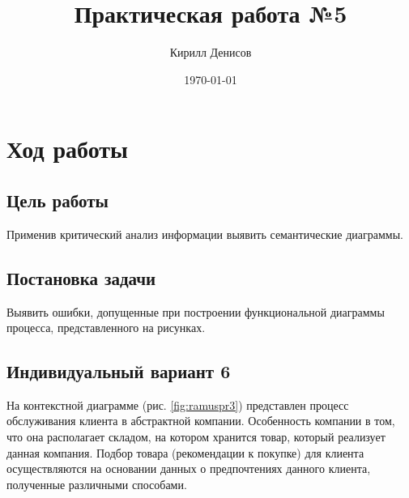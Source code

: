 \documentclass[a4paper,14pt]{extarticle}
\author{Кирилл Денисов}
\title{Практическая работа №5}
\date{\today}
\newcommand{\pathToCommonFolder}{/home/denilai/Documents/repos/latex/Common}
\begin{document}
	\thispagestyle{empty}
	
	\newpage
	\newpage
	\section*{Ход работы}
	
	
	\subsection*{Цель работы}
	Применив критический анализ информации выявить семантические диаграммы.
	
	\subsection*{Постановка задачи}
	Выявить ошибки, допущенные при построении функциональной диаграммы процесса, представленного на рисунках.

	\subsection*{Индивидуальный вариант 6}
	На контекстной диаграмме (рис. \ref{fig:ramuspr3}) представлен процесс обслуживания клиента в абстрактной компании. Особенность компании в том, что она располагает складом, на котором хранится товар, который реализует данная компания. Подбор товара (рекомендации к покупке) для клиента осуществляются на основании данных о предпочтениях данного клиента, полученные различными способами.
	
\end{document}
